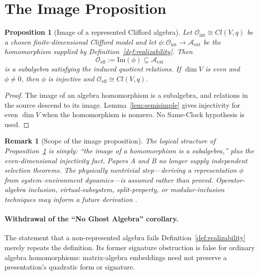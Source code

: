 \documentclass[12pt]{article}
\newtheorem{proposition}[theorem]{Proposition}
\newtheorem{remark}[theorem]{Remark}
\begin{document}
\section{The Image Proposition}
\label{sec:closure}

\begin{proposition}[Image of a represented Clifford algebra]
\label{prop:image}
Let $\mathcal{O}_{\mathrm{int}}\cong Cl(V,q)$ be a chosen finite-dimensional Clifford model and let $\phi:\mathcal O_{\mathrm{int}}\to\mathcal A_{\mathrm{ext}}$ be the homomorphism supplied by Definition~\ref{def:realizability}.  Then
\begin{equation}
    \mathcal{O}_{\mathrm{eff}} := \mathrm{Im}(\phi) \subseteq \mathcal{A}_{\mathrm{ext}}
\end{equation}
is a subalgebra satisfying the induced quotient relations.  If $\dim V$ is even and $\phi\ne0$, then $\phi$ is injective and $\mathcal O_{\mathrm{eff}}\cong Cl(V,q)$.
\end{proposition}

\begin{proof}
The image of an algebra homomorphism is a subalgebra, and relations in the source descend to its image.  Lemma~\ref{lem:semisimple} gives injectivity for even $\dim V$ when the homomorphism is nonzero.  No Same-Clock hypothesis is used.
\end{proof}

\begin{remark}[Scope of the image proposition]
\label{rem:scope}
The logical structure of Proposition~\ref{prop:image} is simply: ``the image of a homomorphism is a subalgebra,'' plus the even-dimensional injectivity fact.  Papers A and B no longer supply independent selection theorems.  The physically nontrivial step---deriving a representation $\phi$ from system--environment dynamics---is assumed rather than proved.  Operator-algebra inclusion, virtual-subsystem, split-property, or modular-inclusion techniques may inform a future derivation \cite{Zanardi2001,DoplicherLongo1984,Wiesbrock1993}.
\end{remark}

\paragraph{Withdrawal of the ``No Ghost Algebra'' corollary.}
The statement that a non-represented algebra fails Definition~\ref{def:realizability} merely repeats the definition.  Its former signature obstruction is false for ordinary algebra homomorphisms: matrix-algebra embeddings need not preserve a presentation's quadratic form or signature.
\end{document}
